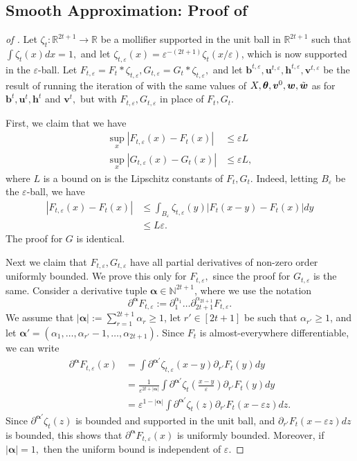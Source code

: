 \documentclass{article}
\newcommand{\1}{\mathbbm{1}}
\theoremstyle{plain}
\theoremstyle{definition}
\theoremstyle{remark}
\newcommand{\eps}{\varepsilon}
\newcommand{\bfu}{\boldsymbol{u}}
\newcommand{\bfv}{\boldsymbol{v}}
\newcommand{\bfh}{\boldsymbol{h}}
\newcommand{\bfb}{\boldsymbol{b}}
\newcommand{\bfalpha}{\boldsymbol{\alpha}}
\newcommand{\bftheta}{\boldsymbol{\theta}}
\newcommand{\bfw}{\boldsymbol{w}}
\newcommand{\R}{\mathbb{R}}
\newcommand{\N}{\mathbb{N}}
\begin{document}
\subsection{Smooth Approximation: Proof of }\label{sec:smooth-approximation}
\begin{proof}[of ]
Let $\zeta_t:\R^{2t+1}\to\R$ be a mollifier supported in the unit ball in $\R^{2t+1}$ such that $\int \zeta_t(x)dx = 1,$ and let $\zeta_{t,\eps}(x) = \eps^{-(2t+1)}\zeta_t(x/\eps)$, which is now supported in the $\eps$-ball. Let $F_{t,\eps} = F_t * \zeta_{t,\eps},G_{t,\eps} = G_t * \zeta_{t,\eps},$ and let $\bfb^{t,\eps},\bfu^{t,\eps},\bfh^{t,\eps},\bfv^{t,\eps}$ be the result of running the iteration of  with the same values of $X,\bftheta,\bfv^0,\bfw,\Tilde{\bfw}$ as for $\bfb^t,\bfu^t,\bfh^t$ and $\bfv^t,$ but with $F_{t,\eps},G_{t,\eps}$ in place of $F_t,G_t.$

First, we claim that we have 
\begin{align*}
    \sup_{x}|F_{t,\eps}(x)-F_t(x)| &\leq \eps L \\
    \sup_{x}|G_{t,\eps}(x)-G_t(x)| &\leq \eps L,
\end{align*}
where $L$ is a bound on is the Lipschitz constants of $F_t,G_t$. Indeed, letting $B_\eps$ be the $\eps$-ball, we have 
\begin{align}
    |F_{t,\eps}(x)-F_t(x)| &\leq \int_{B_\eps} \zeta_{t,\eps}(y)|F_t(x-y) - F_t(x)|dy \nonumber\\
    &\leq L\eps. \label{eq:F-eps-Lipschitz-bound}
\end{align}
The proof for $G$ is identical.

Next we claim that $F_{t,\eps},G_{t,\eps}$ have all partial derivatives of non-zero order uniformly bounded. We prove this only for $F_{t,\eps},$ since the proof for $G_{t,\eps}$ is the same. Consider a derivative tuple $\bfalpha \in \N^{2t+1}$, where we use the notation 
\[
\partial^{\bfalpha} F_{t,\eps} := \partial_1^{\alpha_1}\dots\partial_{2t+1}^{\alpha_{2t+1}} F_{t,\eps}.
\]
We assume that $|\bfalpha|:= \sum_{r=1}^{2t+1}\alpha_r \geq 1$, let $r'\in [2t+1]$ be such that $\alpha_{r'}\geq 1$, and let $\bfalpha' = (\alpha_1,\dots,\alpha_{r'}-1,\dots,\alpha_{2t+1}).$ Since $F_t$ is almost-everywhere differentiable, we can write
\begin{align*}
    \partial^{\bfalpha} F_{t,\eps}(x) &= \int \partial^{\bfalpha'}\zeta_{t,\eps}(x-y)\partial_{r'}F_t(y)dy \\
    &= \frac{1}{\eps^{2t+|\bfalpha|}}\int \partial^{\bfalpha'}\zeta_{t}\left(\frac{x-y}{\eps}\right)\partial_{r'}F_t(y)dy \\
    &= \eps^{1-|\bfalpha|}\int \partial^{\bfalpha'}\zeta_{t}(z)\partial_{r'}F_t(x-\eps z)dz.
\end{align*}
Since $\partial^{\bfalpha'}\zeta_{t}(z)$ is bounded and supported in the unit ball, and $\partial_{r'}F_t(x-\eps z)dz$ is bounded, this shows that $\partial^{\bfalpha} F_{t,\eps}(x)$ is uniformly bounded. Moreover, if $|\bfalpha|=1,$ then the uniform bound is independent of $\eps.$


\end{proof}
\end{document}

